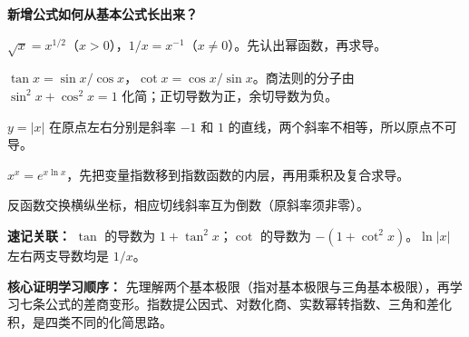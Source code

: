 \begin{explanationbox}
\medskip
\textbf{\textcolor{CExplanation}{新增公式如何从基本公式长出来？}}
\begin{description}[style=nextline,leftmargin=2.8em,labelsep=0.5em,itemsep=0.45em]
\item[\textbf{根式和倒数：}] $\sqrt{x}=x^{1/2}$（$x>0$），$1/x=x^{-1}$（$x\ne0$）。先认出幂函数，再求导。
\item[\textbf{正切与余切：}] $\tan x=\sin x/\cos x$，$\cot x=\cos x/\sin x$。商法则的分子由 $\sin^2x+\cos^2x=1$ 化简；正切导数为正，余切导数为负。
\item[\textbf{绝对值：}] $y=|x|$ 在原点左右分别是斜率 $-1$ 和 $1$ 的直线，两个斜率不相等，所以原点不可导。
\item[\textbf{变量既在底数又在指数：}] $x^x=e^{x\ln x}$，先把变量指数移到指数函数的内层，再用乘积及复合求导。
\item[\textbf{反三角函数（拓展）：}] 反函数交换横纵坐标，相应切线斜率互为倒数（原斜率须非零）。
\end{description}
\medskip
\textbf{\textcolor{CExplanation}{速记关联：}} $\tan$ 的导数为 $1+\tan^2x$；$\cot$ 的导数为 $-(1+\cot^2x)$。$\ln|x|$ 左右两支导数均是 $1/x$。

\medskip
\textbf{\textcolor{CExplanation}{核心证明学习顺序：}} 先理解两个基本极限（指对基本极限与三角基本极限），再学习七条公式的差商变形。指数提公因式、对数化商、实数幂转指数、三角和差化积，是四类不同的化简思路。
\end{explanationbox}
